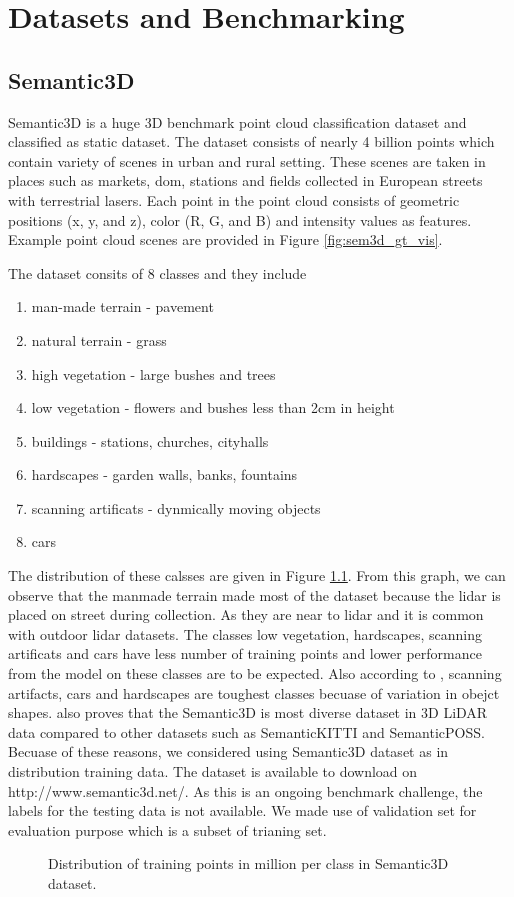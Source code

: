 

    \chapter{Datasets and Benchmarking}
    \section{Semantic3D}
Semantic3D is a huge 3D benchmark point cloud classification dataset and classified as static dataset.
The dataset consists of nearly 4 billion points which contain variety of scenes in urban and rural setting.
These scenes are taken in places such as markets, dom, stations and fields collected in European streets with terrestrial lasers.
Each point in the point cloud consists of geometric positions (x, y, and z), color (R, G, and B) and intensity values as features.
Example point cloud scenes are provided in Figure \ref{fig:sem3d_gt_vis}. 

The dataset consits of 8 classes and they include
\begin{enumerate}
    \item man-made terrain - pavement
    \item natural terrain - grass
    \item high vegetation - large bushes and trees
    \item low vegetation - flowers and bushes less than 2cm in height
    \item buildings - stations, churches, cityhalls
    \item hardscapes - garden walls, banks, fountains
    \item scanning artificats - dynmically moving objects
    \item cars
\end{enumerate}
The distribution of these calsses are given in Figure \ref{fig:sem3ddist}.
From this graph, we can observe that the manmade terrain made most of the dataset because the lidar is placed on street during collection.
As they are near to lidar and it is common with outdoor lidar datasets.
The classes low vegetation, hardscapes, scanning artificats and cars have less number of training points and lower performance from the model on these classes are to be expected.
Also according to \cite{hackel2017semantic3d}, scanning artifacts, cars and hardscapes are toughest classes becuase of variation in obejct shapes.
\cite{survey3d} also proves that the Semantic3D is most diverse dataset in 3D LiDAR data compared to other datasets such as SemanticKITTI and SemanticPOSS.
Becuase of these reasons, we considered using Semantic3D dataset as in distribution training data.
The dataset is available to download on http://www.semantic3d.net/. 
As this is an ongoing benchmark challenge, the labels for the testing data is not available.
We made use of validation set for evaluation purpose which is a subset of trianing set.
\begin{figure}[h!]
    \centering
    
    \caption{Distribution of training points in million per class in Semantic3D dataset.}
    \label{fig:sem3ddist}
\end{figure}


